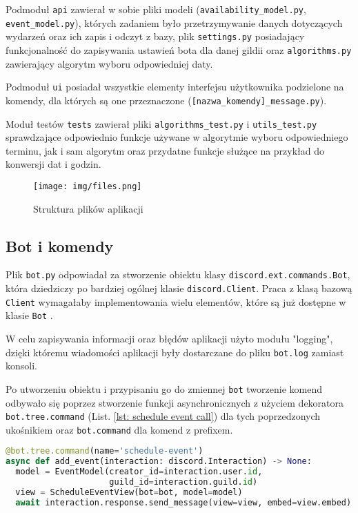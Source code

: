 \documentclass[11pt,a4paper]{article}
\newcommand{\classname}[1]{\texttt{#1}}
\begin{document}
Podmoduł \texttt{api} zawierał w sobie pliki modeli (\texttt{availability\_model.py}, \texttt{event\_model.py}), których zadaniem było przetrzymywanie danych dotyczących wydarzeń oraz ich zapis i odczyt z bazy, plik \texttt{settings.py} posiadający funkcjonalność do zapisywania ustawień bota dla danej gildii oraz \texttt{algorithms.py} zawierający algorytm wyboru odpowiedniej daty.

Podmoduł \texttt{ui} posiadał wszystkie elementy interfejsu użytkownika podzielone na komendy, dla których są one przeznaczone (\texttt{[nazwa\_komendy]\_message.py}).

Moduł testów \texttt{tests} zawierał pliki \texttt{algorithms\_test.py} i \texttt{utils\_test.py} sprawdzające odpowiednio funkcje używane w algorytmie wyboru odpowiedniego terminu, jak i sam algorytm oraz przydatne funkcje służące na przykład do konwersji dat i godzin.

\begin{figure}[H]
    \centering
    \texttt{[image: img/files.png]}
    \caption{Struktura plików aplikacji}
    \label{img: struktura_plikow}
\end{figure}

\subsection{Bot i komendy}

Plik \texttt{bot.py} odpowiadał za stworzenie obiektu klasy \classname{discord.ext.commands.Bot}, która dziedziczy po bardziej ogólnej klasie \classname{discord.Client}. Praca z klasą bazową \classname{Client} wymagałaby implementowania wielu elementów, które są już dostępne w klasie \classname{Bot} \cite{BotVsClientArticle}. 

W celu zapisywania informacji oraz błędów aplikacji użyto modułu "logging", dzięki któremu wiadomości aplikacji były dostarczane do pliku \texttt{bot.log} zamiast konsoli.

Po utworzeniu obiektu i przypisaniu go do zmiennej \classname{bot} tworzenie komend odbywało się poprzez stworzenie funkcji asynchronicznych z użyciem dekoratora \classname{bot.tree.command} (List. \ref{lst: schedule event call}) dla tych poprzedzonych ukośnikiem oraz \classname{bot.command} dla komend z prefixem.

\begin{lstlisting}[caption={Komenda "/schedule-event"},label={lst: schedule event call},language=Python]
@bot.tree.command(name='schedule-event')
async def add_event(interaction: discord.Interaction) -> None:
  model = EventModel(creator_id=interaction.user.id,
                     guild_id=interaction.guild.id)
  view = ScheduleEventView(bot=bot, model=model)
  await interaction.response.send_message(view=view, embed=view.embed)
\end{lstlisting}
\end{document}
